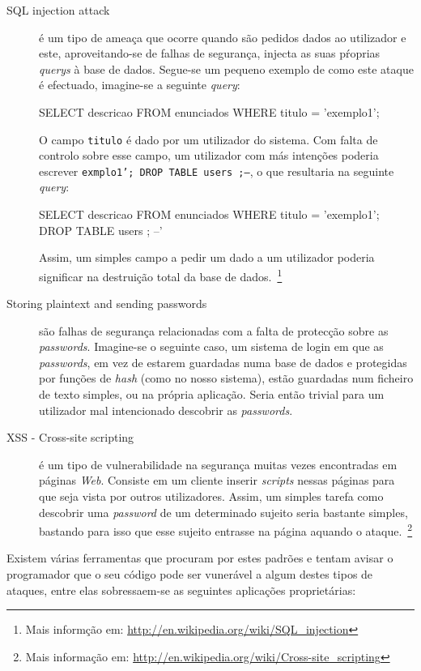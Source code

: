 \begin{description}
\item[SQL injection attack] é um tipo de ameaça que ocorre quando são pedidos dados ao utilizador e este, aproveitando-se de falhas de segurança, injecta as suas pŕoprias 
\emph{querys} à base de dados. Segue-se um pequeno exemplo de como este ataque é efectuado, imagine-se a seguinte \emph{query}:
\begin{code_files}
SELECT descricao FROM enunciados WHERE titulo = 'exemplo1';
\end{code_files}
O campo \texttt{titulo} é dado por um utilizador do sistema. Com falta de controlo sobre esse campo, um utilizador com más intenções poderia escrever \texttt{exmplo1'; DROP TABLE users ;--}, 
o que resultaria na seguinte \emph{query}:
\begin{code_files}
SELECT descricao FROM enunciados WHERE titulo = 'exemplo1'; DROP TABLE users ; --'
\end{code_files}
Assim, um simples campo a pedir um dado a um utilizador poderia significar na destruição total da base de dados.~\footnote{Mais informção em: \url{http://en.wikipedia.org/wiki/SQL_injection}}

\item[Storing plaintext and sending passwords] são falhas de segurança relacionadas com a falta de protecção sobre as \emph{passwords}. Imagine-se o seguinte caso, um sistema de login em que as \emph{passwords}, 
em vez de estarem guardadas numa base de dados e protegidas por funções de \emph{hash} (como no nosso sistema), estão guardadas num ficheiro de texto simples, ou na própria aplicação. 
Seria então trivial para um utilizador mal intencionado descobrir as \emph{passwords}. 

\item[XSS - Cross-site scripting] é um tipo de vulnerabilidade na segurança muitas vezes encontradas em páginas \emph{Web}. Consiste em um cliente inserir \emph{scripts}
 nessas páginas para que seja vista por outros utilizadores. Assim, um simples tarefa como descobrir uma \emph{password} de um determinado sujeito seria bastante simples, bastando 
para isso que esse sujeito entrasse na página aquando o ataque.~\footnote{Mais informação em: \url{http://en.wikipedia.org/wiki/Cross-site_scripting}}
\end{description}

Existem várias ferramentas que procuram por estes padrões e tentam avisar o programador que o seu código pode ser vunerável a algum destes tipos de ataques, 
entre elas sobressaem-se as seguintes aplicações proprietárias:

